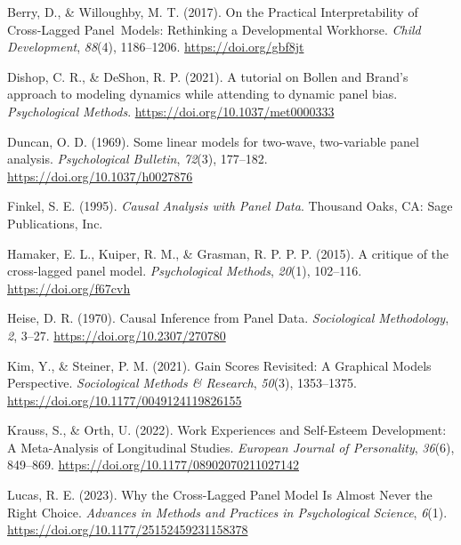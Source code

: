 \documentclass[
  man,mask,floatsintext]{apa6}
\newlength{\cslhangindent}
\newenvironment{CSLReferences}[2] %
 {\begin{list}{}{%
  \setlength{\itemindent}{0pt}
  \setlength{\leftmargin}{0pt}
  \setlength{\parsep}{0pt}
  \ifodd #1
   \setlength{\leftmargin}{\cslhangindent}
   \setlength{\itemindent}{-1\cslhangindent}
  \fi
  \setlength{\itemsep}{#2\baselineskip}}}
 {\end{list}}
\begin{document}
\label{refs}
\begin{CSLReferences}{1}{0}
Berry, D., \& Willoughby, M. T. (2017). On the {Practical Interpretability} of {Cross-Lagged Panel~Models}: {Rethinking} a {Developmental Workhorse}. \emph{Child Development}, \emph{88}(4), 1186--1206. \url{https://doi.org/gbf8jt}

Dishop, C. R., \& DeShon, R. P. (2021). A tutorial on {Bollen} and {Brand}'s approach to modeling dynamics while attending to dynamic panel bias. \emph{Psychological Methods}. \url{https://doi.org/10.1037/met0000333}

Duncan, O. D. (1969). Some linear models for two-wave, two-variable panel analysis. \emph{Psychological Bulletin}, \emph{72}(3), 177--182. \url{https://doi.org/10.1037/h0027876}

Finkel, S. E. (1995). \emph{Causal {Analysis} with {Panel Data}}. Thousand Oaks, CA: Sage Publications, Inc.

Hamaker, E. L., Kuiper, R. M., \& Grasman, R. P. P. P. (2015). A critique of the cross-lagged panel model. \emph{Psychological Methods}, \emph{20}(1), 102--116. \url{https://doi.org/f67cvh}

Heise, D. R. (1970). Causal {Inference} from {Panel Data}. \emph{Sociological Methodology}, \emph{2}, 3--27. \url{https://doi.org/10.2307/270780}

Kim, Y., \& Steiner, P. M. (2021). Gain {Scores Revisited}: {A Graphical Models Perspective}. \emph{Sociological Methods \& Research}, \emph{50}(3), 1353--1375. \url{https://doi.org/10.1177/0049124119826155}

Krauss, S., \& Orth, U. (2022). Work {Experiences} and {Self-Esteem Development}: {A Meta-Analysis} of {Longitudinal Studies}. \emph{European Journal of Personality}, \emph{36}(6), 849--869. \url{https://doi.org/10.1177/08902070211027142}

Lucas, R. E. (2023). Why the {Cross-Lagged Panel Model Is Almost Never} the {Right Choice}. \emph{Advances in Methods and Practices in Psychological Science}, \emph{6}(1). \url{https://doi.org/10.1177/25152459231158378}


\end{CSLReferences}
\end{document}
